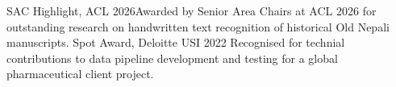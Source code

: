 	

\begin{talks}
    \award
    {SAC Highlight, ACL 2026}{}{}{Awarded by Senior Area Chairs at ACL 2026 for outstanding research on handwritten text recognition of historical Old Nepali manuscripts.}
    \award
    {Spot Award, Deloitte USI 2022 }{}{}{Recognised for technial contributions to data pipeline development and testing for a global pharmaceutical client project.}
\end{talks}    
\vspace{-3mm}






